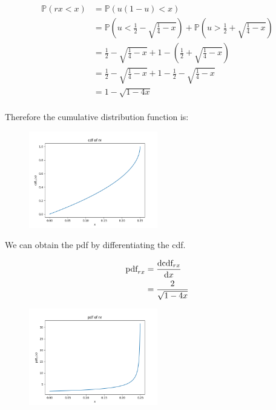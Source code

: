 \documentclass[10pt,\jkfside,a4paper]{article}
\begin{document}
\begin{enumerate}
\[
\begin{split}
\mathbb{P}(rx < x)
&= \mathbb{P}(u(1 - u) < x) \\
&= \mathbb{P}\left(u < \frac{1}{2} - \sqrt{\frac{1}{4} - x}\right) +
\mathbb{P}\left(u > \frac{1}{2} + \sqrt{\frac{1}{4} - x}\right) \\
&= \frac{1}{2} - \sqrt{\frac{1}{4} - x} + 1 - \left( \frac{1}{2} +
\sqrt{\frac{1}{4} - x} \right) \\
&= \frac{1}{2} - \sqrt {\frac{1}{4} - x} + 1 - \frac{1}{2} - \sqrt
{\frac{1}{4} - x} \\
&= 1 - \sqrt {1 - 4x} \\
\end{split}
\]

Therefore the cumulative distribution function is:

\begin{figure}[H]
\centering
\includegraphics[width=0.5\textwidth]{./cdf_rx}
\end{figure}

We can obtain the pdf by differentiating the cdf.

\[
\begin{split}
\text{pdf}_{rx}
&= \dv{\text{cdf}_{rx}}{x} \\
&= \frac{2}{\sqrt{1 - 4x}} \\
\end{split}
\]

\begin{figure}[H]
\centering
\includegraphics[width=0.5\textwidth]{./pdf_rx}
\end{figure}


\end{enumerate}
\end{document}
